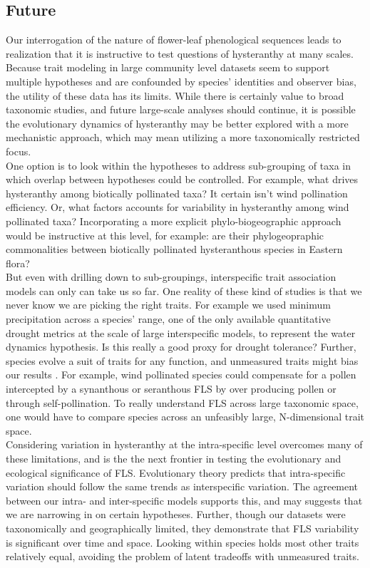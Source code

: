 \documentclass[12pt]{article}\usepackage[]{graphicx}\usepackage[]{color}
\begin{document}
\subsection*{Future}
 \indent\indent Our interrogation of the nature of flower-leaf phenological sequences leads to realization that it is instructive to test questions of hysteranthy at many scales. Because trait modeling in large community level datasets seem to support multiple hypotheses and are confounded by species' identities and observer bias, the utility of these data has its limits. While there is certainly value to broad taxonomic studies, and future large-scale analyses should continue, it is possible the evolutionary dynamics of hysteranthy may be better explored with a more mechanistic approach, which may mean utilizing a more taxonomically restricted focus.\\
\indent One option is to look within the hypotheses to address sub-grouping of taxa in which overlap between hypotheses could be controlled. For example, what drives hysteranthy among biotically pollinated taxa? It certain isn't wind pollination efficiency. Or, what factors accounts for variability in hysteranthy among wind pollinated taxa? Incorporating a more explicit phylo-biogeographic approach would be instructive at this level, for example: are their phylogeopraphic commonalities between biotically pollinated hysteranthous species in Eastern flora?\\
\indent But even with drilling down to sub-groupings, interspecific trait association models can only can take us so far. One reality of these kind of studies is that we never know we are picking the right traits. For example we used minimum precipitation across a species' range, one of the only available quantitative drought metrics at the scale of large interspecific models, to represent the water dynamics hypothesis. Is this really a good proxy for drought tolerance? Further, species evolve a suit of traits for any function, and unmeasured traits might bias our results \citep{Davies2019}. For example, wind pollinated species could compensate for a pollen intercepted by a synanthous or seranthous FLS by over producing pollen or through self-pollination. To really understand FLS across large taxonomic space, one would have to compare species across an unfeasibly large, N-dimensional trait space.\\
\indent Considering variation in hysteranthy at the intra-specific level overcomes many of these limitations, and is the the next frontier in testing the evolutionary and ecological significance of FLS. Evolutionary theory predicts that intra-specific variation should follow the same trends as interspecific variation. The agreement between our intra- and inter-specific models supports this, and may suggests that we are narrowing in on certain hypotheses. Further, though our datasets were taxonomically and geographically limited, they demonstrate that FLS variability is significant over time and space. Looking within species holds most other traits relatively equal, avoiding the problem of latent tradeoffs with unmeasured traits.\\
\end{document}
